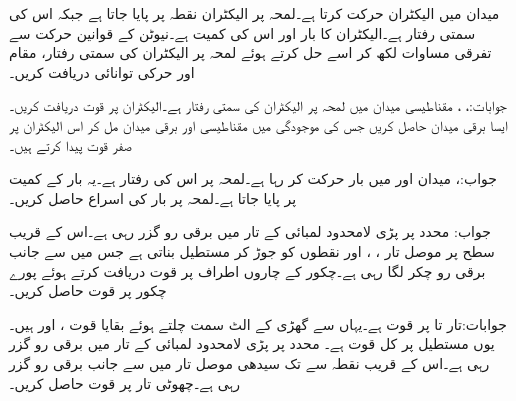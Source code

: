 \newpage
{}
میدان  میں الیکٹران  حرکت کرتا ہے۔لمحہ  پر الیکٹران نقطہ  پر پایا جاتا ہے جبکہ اس کی سمتی رفتار  ہے۔الیکٹران کا بار  اور اس کی کمیت  ہے۔نیوٹن کے قوانین حرکت سے تفرقی مساوات لکھ کر اسے حل کرتے ہوئے لمحہ  پر الیکٹران کی سمتی رفتار، مقام اور حرکی توانائی دریافت کریں۔

جوابات:، ، 
مقناطیسی میدان  میں لمحہ  پر الیکٹران کی سمتی رفتار  ہے۔الیکٹران پر قوت دریافت کریں۔ایسا برقی میدان حاصل کریں جس کی موجودگی میں مقناطیسی اور برقی میدان مل کر اس الیکٹران پر صفر قوت  پیدا کرتے ہیں۔

جواب:، 
میدان  اور  میں بار  حرکت کر رہا ہے۔لمحہ  پر اس کی رفتار  ہے۔یہ بار  کے کمیت پر پایا جاتا ہے۔لمحہ  پر بار کی اسراع حاصل کریں۔

جواب:
محدد  پر پڑی لامحدود لمبائی کے تار میں  برقی رو گزر رہی ہے۔اس کے قریب سطح  پر موصل تار ، ،  اور  نقطوں کو جوڑ کر مستطیل بناتی ہے جس میں  سے  جانب  برقی رو چکر  لگا رہی ہے۔چکور کے چاروں اطراف پر قوت دریافت کرتے ہوئے پورے چکور پر قوت حاصل کریں۔

جوابات:تار  تا  پر قوت  ہے۔یہاں سے گھڑی کے الٹ سمت چلتے ہوئے بقایا قوت  ،  اور  ہیں۔یوں مستطیل پر کل قوت  ہے۔
محدد  پر پڑی لامحدود لمبائی کے تار میں  برقی رو گزر رہی ہے۔اس کے قریب نقطہ  سے  تک سیدھی موصل تار میں  سے  جانب  برقی رو گزر رہی ہے۔چھوٹی تار پر قوت حاصل کریں۔

